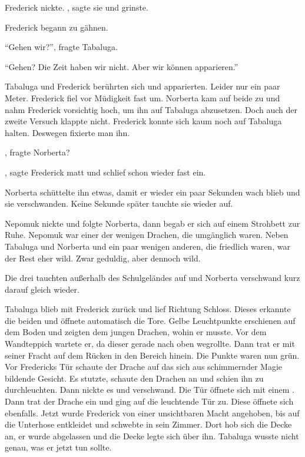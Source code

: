  Frederick nickte. , sagte sie und grinste.

Frederick begann zu gähnen.

\enquote{Gehen wir?}, fragte Tabaluga.

\enquote{Gehen? Die Zeit haben wir nicht. Aber wir können apparieren.}

Tabaluga und Frederick berührten sich und apparierten. Leider nur ein paar Meter. Frederick fiel vor Müdigkeit fast um. Norberta kam auf beide zu und nahm Frederick vorsichtig hoch, um ihn auf Tabaluga abzusetzen. Doch auch der zweite Versuch klappte nicht. Frederick konnte sich kaum noch auf Tabaluga halten. Deswegen fixierte man ihn.

, fragte Norberta?



, sagte Frederick matt und schlief schon wieder fast ein.

Norberta schüttelte ihn etwas, damit er wieder ein paar Sekunden wach blieb und sie verschwanden. Keine Sekunde später tauchte sie wieder auf. 



Nepomuk nickte und folgte Norberta, dann begab er sich auf einem Strohbett zur Ruhe. Nepomuk war einer der wenigen Drachen, die umgänglich waren. Neben Tabaluga und Norberta und ein paar wenigen anderen, die friedlich waren, war der Rest eher wild. Zwar geduldig, aber dennoch wild.

Die drei tauchten außerhalb des Schulgeländes auf und Norberta verschwand kurz darauf gleich wieder.

Tabaluga blieb mit Frederick zurück und lief Richtung Schloss. Dieses erkannte die beiden und öffnete automatisch die Tore. Gelbe Leuchtpunkte erschienen auf dem Boden und zeigten dem jungen Drachen, wohin er musste. Vor dem Wandteppich wartete er, da dieser gerade nach oben wegrollte. Dann trat er mit seiner Fracht auf dem Rücken in den Bereich hinein. Die Punkte waren nun grün. Vor Fredericks Tür schaute der Drache auf das sich aus schimmernder Magie bildende Gesicht. Es stutzte, schaute den Drachen an und schien ihn zu durchleuchten. Dann nickte es und verschwand. Die Tür öffnete sich mit einem .  Dann trat der Drache ein und ging auf die leuchtende Tür zu. Diese öffnete sich ebenfalls. Jetzt wurde Frederick von einer unsichtbaren Macht angehoben, bis auf die Unterhose entkleidet und schwebte in sein Zimmer. Dort hob sich die Decke an, er wurde abgelassen und die Decke legte sich über ihn. Tabaluga wusste nicht genau, was er jetzt tun sollte.

